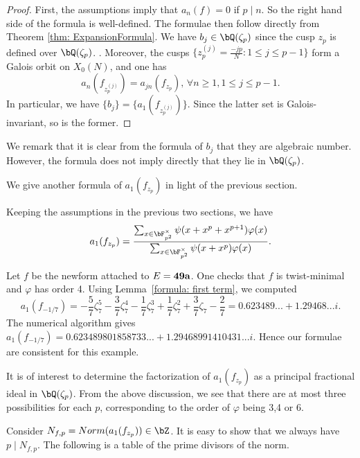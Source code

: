 \documentclass [11pt, proquest] {uwthesis}[2015/03/03]
\begin{document}
\begin{proof}
First, the assumptions imply that $a_{n}(f) =  0$ if $p \mid n$. So the right hand side of the formula is well-defined. 
The formulae then follow directly from Theorem \ref{thm: ExpansionFormula}.   We have $b_j \in \bQ(\zeta_p)$ since the cusp $z_p$ is defined over $\bQ(\zeta_p)$. . Moreover, the cusps $\{z_p^{(j)} = \frac{-jp}{N}: 1 \leq j \leq p-1\}$ form a Galois orbit on $X_0(N)$, and one has 
\[
	a_n(f_{z_p^{(j)}}) = a_{jn}(f_{z_p}), \, \forall n \geq 1, 1 \leq j \leq p-1. 
\]
In particular, we have $\{b_j\} = \{a_1(f_{z_p^{(j)}})\}$. Since the latter set is Galois-invariant, so is the former. 
\end{proof}

We remark that it is clear from the formula of $b_j$ that they are algebraic number. However, the formula does not imply directly that they lie in $\bQ(\zeta_p)$. 

We give another formula of $a_1(f_{z_p})$ in light of the previous section. 

\begin{Lemma} \label{formula: first term}
Keeping the assumptions in the previous two sections, we have 
$$a_1(f_{z_p}) = \frac{\sum_{x \in \bF_{p^2}^{\times}} \psi(x+x^p+x^{p+1}) \varphi(x)}{\sum_{x \in \bF_{p^2}^{\times} }\psi(x+x^p) \varphi(x)}. $$
\end{Lemma}

\begin{Example}
Let $f$ be the newform attached to $E  =\bf{49a}$. One checks that $f$ is twist-minimal and $\varphi$ has order 4. Using Lemma~\ref{formula: first term}, we computed $$a_1(f_{-1/7}) = -\frac{5}{7} \zeta_{7}^{5} - \frac{3}{7} \zeta_{7}^{4} - \frac{1}{7} \zeta_{7}^{3} + \frac{1}{7} \zeta_{7}^{2} + \frac{3}{7} \zeta_{7} - \frac{2}{7} = 0.623489... + 1.29468...i. $$
The numerical algorithm gives $a_1(f_{-1/7}) = 0.623489801858733...+ 1.29468991410431...i$. Hence our formulae are 
consistent for this example.
\end{Example}


It is of interest to determine the factorization of $a_1(f_{z_p})$ as a principal fractional ideal in $\bQ(\zeta_p)$. From the 
above discussion, we see that there are at most three possibilities for each $p$, corresponding to the order of $\varphi$ being 3,4 or 6. 

Consider $N_{f,p} = Norm(a_1(f_{z_p})) \in \bZ$. It is easy to show that we always have $p \mid N_{f,p}$. The following is a table of the prime divisors of the norm. 
\end{document}
